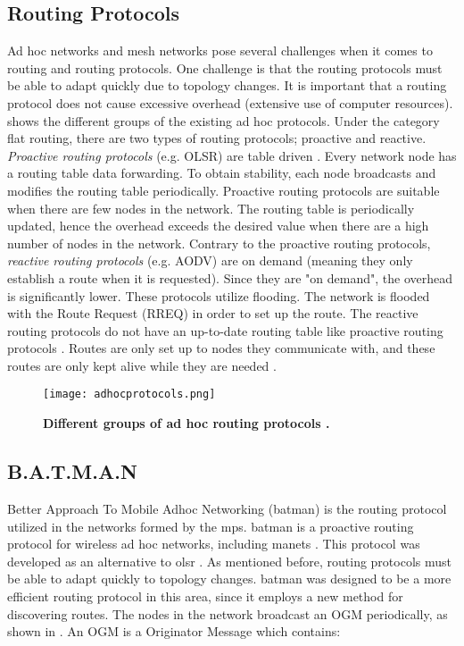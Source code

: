 \subsection{Routing Protocols}
Ad hoc networks and mesh networks pose several challenges when it comes to routing and routing protocols. One challenge is that the routing protocols must be able to adapt quickly due to topology changes. It is important that a routing protocol does not cause excessive overhead (extensive use of computer resources).  shows the different groups of the existing ad hoc protocols. Under the category flat routing, there are two types of routing protocols; proactive and reactive. \textit{Proactive routing protocols} (e.g. OLSR) are table driven \citep{proactivereactive}. Every network node has a routing table data forwarding. To obtain stability, each node broadcasts and modifies the routing table periodically. Proactive routing protocols are suitable when there are few nodes in the network. The routing table is periodically updated, hence the overhead exceeds the desired value when there are a high number of nodes in the network. Contrary to the proactive routing protocols, \textit{reactive routing protocols} (e.g. AODV) are on demand (meaning they only establish a route when it is requested). Since they are "on demand", the overhead is significantly lower. These protocols utilize flooding. The network is flooded with the Route Request (RREQ) in order to set up the route. The reactive routing protocols do not have an up-to-date routing table like proactive routing protocols \cite{proactivereactive}. Routes are only set up to nodes they communicate with, and these routes are only kept alive while they are needed  \cite{adhoc2}. 


\begin{figure}[t]
  \centering
    \texttt{[image: adhocprotocols.png]}
     \caption[Ad Hoc routing protocols]{\textbf{Different groups of ad hoc routing protocols \cite{adhoc}.}}
\label{fig:adhocprotocols}
\end{figure}


\subsection{B.A.T.M.A.N}
\label{subsec:batman}
Better Approach To Mobile Adhoc Networking (\gls{batman}) is the routing protocol utilized in the networks formed by the \glspl{mp}. \gls{batman} is a proactive routing protocol for wireless ad hoc networks, including \glspl{manet} \cite{batman}. This protocol was developed as an alternative to \gls{olsr} \cite{batman2}. As mentioned before, routing protocols must be able to adapt quickly to topology changes. \gls{batman} was designed to be a more efficient routing protocol in this area, since it employs a new method for discovering routes. The nodes in the network broadcast an OGM periodically, as shown in . An OGM is a Originator Message which contains: 

